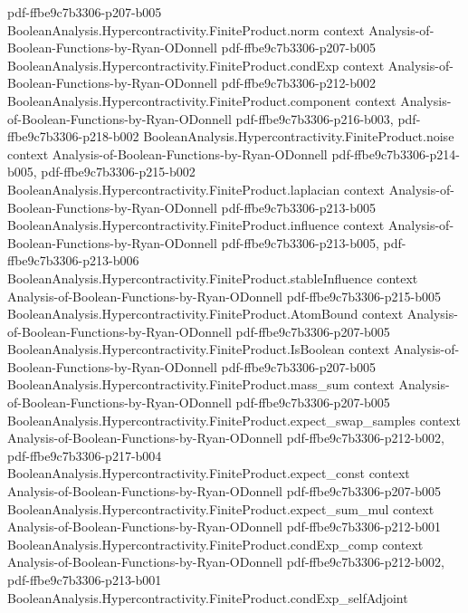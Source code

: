 \begin{theorem}
  {pdf-ffbe9c7b3306-p207-b005}
\proofstep
  {BooleanAnalysis.Hypercontractivity.FiniteProduct.norm}
  {context}
  {Analysis-of-Boolean-Functions-by-Ryan-ODonnell}
  {pdf-ffbe9c7b3306-p207-b005}
\proofstep
  {BooleanAnalysis.Hypercontractivity.FiniteProduct.condExp}
  {context}
  {Analysis-of-Boolean-Functions-by-Ryan-ODonnell}
  {pdf-ffbe9c7b3306-p212-b002}
\proofstep
  {BooleanAnalysis.Hypercontractivity.FiniteProduct.component}
  {context}
  {Analysis-of-Boolean-Functions-by-Ryan-ODonnell}
  {pdf-ffbe9c7b3306-p216-b003,
    pdf-ffbe9c7b3306-p218-b002}
\proofstep
  {BooleanAnalysis.Hypercontractivity.FiniteProduct.noise}
  {context}
  {Analysis-of-Boolean-Functions-by-Ryan-ODonnell}
  {pdf-ffbe9c7b3306-p214-b005,
    pdf-ffbe9c7b3306-p215-b002}
\proofstep
  {BooleanAnalysis.Hypercontractivity.FiniteProduct.laplacian}
  {context}
  {Analysis-of-Boolean-Functions-by-Ryan-ODonnell}
  {pdf-ffbe9c7b3306-p213-b005}
\proofstep
  {BooleanAnalysis.Hypercontractivity.FiniteProduct.influence}
  {context}
  {Analysis-of-Boolean-Functions-by-Ryan-ODonnell}
  {pdf-ffbe9c7b3306-p213-b005,
    pdf-ffbe9c7b3306-p213-b006}
\proofstep
  {BooleanAnalysis.Hypercontractivity.FiniteProduct.stableInfluence}
  {context}
  {Analysis-of-Boolean-Functions-by-Ryan-ODonnell}
  {pdf-ffbe9c7b3306-p215-b005}
\proofstep
  {BooleanAnalysis.Hypercontractivity.FiniteProduct.AtomBound}
  {context}
  {Analysis-of-Boolean-Functions-by-Ryan-ODonnell}
  {pdf-ffbe9c7b3306-p207-b005}
\proofstep
  {BooleanAnalysis.Hypercontractivity.FiniteProduct.IsBoolean}
  {context}
  {Analysis-of-Boolean-Functions-by-Ryan-ODonnell}
  {pdf-ffbe9c7b3306-p207-b005}
\proofstep
  {BooleanAnalysis.Hypercontractivity.FiniteProduct.mass_sum}
  {context}
  {Analysis-of-Boolean-Functions-by-Ryan-ODonnell}
  {pdf-ffbe9c7b3306-p207-b005}
\proofstep
  {BooleanAnalysis.Hypercontractivity.FiniteProduct.expect_swap_samples}
  {context}
  {Analysis-of-Boolean-Functions-by-Ryan-ODonnell}
  {pdf-ffbe9c7b3306-p212-b002,
    pdf-ffbe9c7b3306-p217-b004}
\proofstep
  {BooleanAnalysis.Hypercontractivity.FiniteProduct.expect_const}
  {context}
  {Analysis-of-Boolean-Functions-by-Ryan-ODonnell}
  {pdf-ffbe9c7b3306-p207-b005}
\proofstep
  {BooleanAnalysis.Hypercontractivity.FiniteProduct.expect_sum_mul}
  {context}
  {Analysis-of-Boolean-Functions-by-Ryan-ODonnell}
  {pdf-ffbe9c7b3306-p212-b001}
\proofstep
  {BooleanAnalysis.Hypercontractivity.FiniteProduct.condExp_comp}
  {context}
  {Analysis-of-Boolean-Functions-by-Ryan-ODonnell}
  {pdf-ffbe9c7b3306-p212-b002,
    pdf-ffbe9c7b3306-p213-b001}
\proofstep
  {BooleanAnalysis.Hypercontractivity.FiniteProduct.condExp_selfAdjoint}

\end{theorem}
